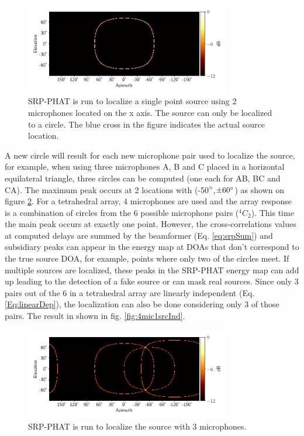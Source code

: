 \begin{figure}[H]
    \centering
    \includegraphics[width=0.8\textwidth]{Figures/2mic1srcRes.png}
    \caption{SRP-PHAT is run to localize a single point source using 2 microphones located on the x axis. The source can only be localized to a circle. The blue cross in the figure indicates the actual source location.}
    \label{fig:2mic1src}
\end{figure}
A new circle will result for each new microphone pair used to localize the source, for example, when using three microphones A, B and C placed in a horizontal equilateral triangle, three circles can be computed (one each for AB, BC and CA). The maximum peak occurs at 2 locations with (-50$\degree$,$\pm 60\degree$) as shown on figure \ref{fig:3mic1src}. For a tetrahedral array, 4 microphones are used and the array response is a combination of circles from the 6 possible microphone pairs ($^4C_2$). This time the main peak occurs at exactly one point. However, the cross-correlations values at computed delays are summed by the beamformer (Eq. \ref{eq:srpSum}) and subsidiary peaks can appear in the energy map at DOAs that don't correspond to the true source DOA, for example, points where only two of the circles meet. If multiple sources are localized, these peaks in the SRP-PHAT energy map can add up leading to the detection of a fake source or can mask real sources. Since only 3 pairs out of the 6 in a tetrahedral array are linearly independent (Eq. \ref{Eq:linearDep}), the localization can also be done considering only 3 of those pairs. The result in shown in fig. \ref{fig:4mic1srcInd}.
\begin{figure}[!ht]
    \centering
    \includegraphics[width=0.8\textwidth]{Figures/3mic1srcRes.png}
    \caption{SRP-PHAT is run to localize the source with 3 microphones.}
    \label{fig:3mic1src}
\end{figure}

